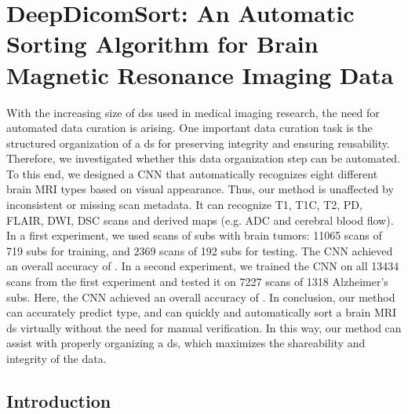 
\chapter[DeepDicomSort: An Automatic Sorting Algorithm for Brain Magnetic Resonance Imaging Data][DeepDicomSort]{DeepDicomSort: An Automatic Sorting Algorithm for Brain Magnetic Resonance Imaging Data}\label{chap:DDS}
\begin{ChapterAbstract}
With the increasing size of \glspl{ds} used in medical imaging research, the need for automated data curation is arising.
One important data curation task is the structured organization of a \gls{ds} for preserving integrity and ensuring reusability.
Therefore, we investigated whether this data organization step can be automated.
To this end, we designed a \gls{CNN} that automatically recognizes eight different brain \gls{MRI} \glspl{type} based on visual appearance.
Thus, our method is unaffected by inconsistent or missing \gls{scan} metadata.
It can recognize \gls{T1}, \gls{T1C}, \gls{T2}, \gls{PD}, \gls{FLAIR}, \gls{DWI}, \gls{DSC} \glspl{scan} and derived maps (e.g. \acrlong{ADC} and cerebral blood flow).
In a first experiment, we used \glspl{scan} of \glspl{sub} with brain tumors: 11065 \glspl{scan} of 719 \glspl{sub} for training, and 2369 \glspl{scan} of 192 \glspl{sub} for testing.
The \gls{CNN} achieved an overall accuracy of .
In a second experiment, we trained the \gls{CNN} on all 13434 \glspl{scan} from the first experiment and tested it on 7227 \glspl{scan} of 1318 Alzheimer's \glspl{sub}.
Here, the \gls{CNN} achieved an overall accuracy of .
In conclusion, our method can accurately predict \gls{type}, and can quickly and automatically sort a brain \gls{MRI} \gls{ds} virtually without the need for manual verification.
In this way, our method can assist with properly organizing a \gls{ds}, which maximizes the shareability and integrity of the data.

\end{ChapterAbstract}

\section{Introduction}

